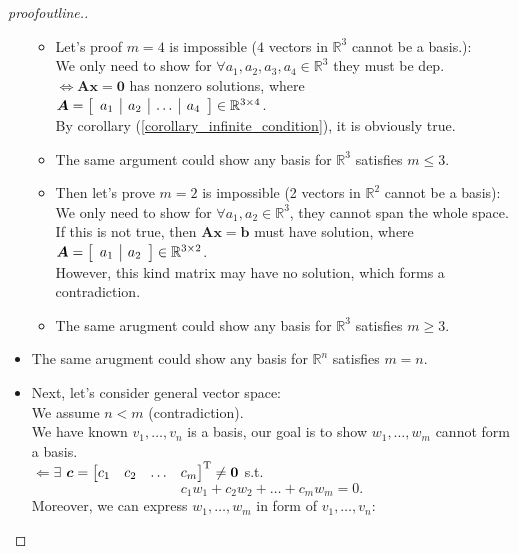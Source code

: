 \begin{proof}[proofoutline.]
\begin{itemize}
\begin{itemize}
\item
Let's proof $m=4$ is impossible ($4$ vectors in $\mathbb{R}^{3}$ cannot be a basis.):\\
We only need to show for $\forall a_1,a_2,a_3,a_4\in\mathbb{R}^{3}$ they must be dep.\\
$\Longleftrightarrow$$\bm{Ax} = \bm 0$ has nonzero solutions, where $\bm A = \left[\begin{array}{c|c|c|c}
a_1&a_2&\dots&a_4
\end{array}\right]\in \mathbb{R}^{3\times 4}$. \\
By corollary (\ref{corollary_infinite_condition}), it is obviously true.
\item
The same argument could show any basis for $\mathbb{R}^{3}$ satisfies $m\le 3$.
\item
Then let's prove $m=2$ is impossible (2 vectors in $\mathbb{R}^{2}$ cannot be a basis):\\
We only need to show for $\forall a_1,a_2\in \mathbb{R}^{3}$, they cannot span the whole space.\\
If this is not true, then $\bm{Ax} = \bm b$ must have solution, where $\bm A = \left[\begin{array}{c|c}
a_1&a_2
\end{array}\right]\in \mathbb{R}^{3\times 2}$.\\
However, this kind matrix may have no solution, which forms a contradiction.
\item
The same arugment could show any basis for $\mathbb{R}^{3}$ satisfies $m\ge 3$.
\end{itemize}
\item
The same arugment could show any basis for $\mathbb{R}^{n}$ satisfies $m=n$.
\item
Next, let's consider general vector space:\\
We assume $n<m$ (contradiction).\\
We have known $v_1,\dots,v_n$ is a basis, our goal is to show $w_1,\dots,w_m$ cannot form a basis.\\
$\Leftarrow\exists$ $\bm c = \begin{bmatrix}
c_1&c_2&\dots&c_m
\end{bmatrix}^{\mathrm T}\ne\bm 0$ s.t.
\begin{equation}\label{combination}
c_1w_1+c_2w_2+\dots+c_mw_m = 0.
\end{equation}
Moreover, we can express $w_1,\dots,w_m$ in form of $v_1,\dots,v_n$:
\begin{equation}\label{basis_for_w}

\end{equation}
\end{itemize}
\end{proof}

